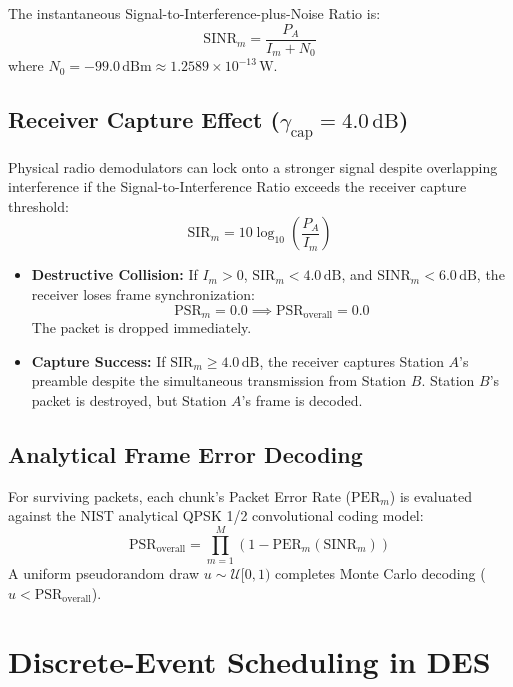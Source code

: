 \documentclass[11pt,a4paper]{article}
\begin{document}
The instantaneous Signal-to-Interference-plus-Noise Ratio is:
\begin{equation}
\mathrm{SINR}_m = \frac{P_A}{I_m + N_0}
\end{equation}
where $N_0 = -99.0\,\mathrm{dBm} \approx 1.2589 \times 10^{-13}\,\mathrm{W}$.

\subsection{Receiver Capture Effect ($\gamma_{\mathrm{cap}} = 4.0\,\mathrm{dB}$)}
Physical radio demodulators can lock onto a stronger signal despite overlapping interference if the Signal-to-Interference Ratio exceeds the receiver capture threshold:
\begin{equation}
\mathrm{SIR}_m = 10 \log_{10}\left( \frac{P_A}{I_m} \right)
\end{equation}
\begin{itemize}[noitemsep]
    \item \textbf{Destructive Collision:} If $I_m > 0$, $\mathrm{SIR}_m < 4.0\,\mathrm{dB}$, and $\mathrm{SINR}_m < 6.0\,\mathrm{dB}$, the receiver loses frame synchronization:
    \begin{equation}
    \mathrm{PSR}_m = 0.0 \implies \mathrm{PSR}_{\mathrm{overall}} = 0.0
    \end{equation}
    The packet is dropped immediately.
    \item \textbf{Capture Success:} If $\mathrm{SIR}_m \ge 4.0\,\mathrm{dB}$, the receiver captures Station $A$'s preamble despite the simultaneous transmission from Station $B$. Station $B$'s packet is destroyed, but Station $A$'s frame is decoded.
\end{itemize}

\subsection{Analytical Frame Error Decoding}
For surviving packets, each chunk's Packet Error Rate ($\mathrm{PER}_m$) is evaluated against the NIST analytical QPSK 1/2 convolutional coding model:
\begin{equation}
\mathrm{PSR}_{\mathrm{overall}} = \prod_{m=1}^M \left( 1 - \mathrm{PER}_m(\mathrm{SINR}_m) \right)
\end{equation}
A uniform pseudorandom draw $u \sim \mathcal{U}[0, 1)$ completes Monte Carlo decoding ($u < \mathrm{PSR}_{\mathrm{overall}}$).

\section{Discrete-Event Scheduling in DES}
\end{document}
